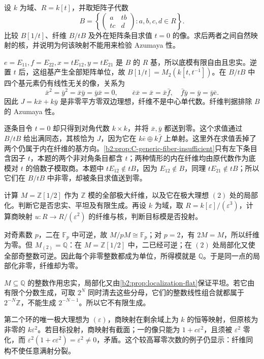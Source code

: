 \begin{exercise}\label{b2:ex:C-generic-fiber-insufficient}
	设 \(k\) 为域、\(R=k[t]\)，并取矩阵子代数
	\[
		B=\left\{\begin{pmatrix}a&tb\\tc&d\end{pmatrix}:a,b,c,d\in R\right\}.
	\]
	比较 \(B[1/t]\)、纤维 \(B/tB\) 及外在矩阵条目求值 \(t=0\) 的像。求后两者之间自然映射的核，并说明为何该映射不能用来检验 Azumaya 性。
\end{exercise}
\begin{solution}
	\(e=E_{11},f=E_{22},x=tE_{12},y=tE_{21}\) 是 \(B\) 的 \(R\) 基，所以底模有限自由且忠实。逆置 \(t\) 后，这组基产生全部矩阵单位，故 \(B[1/t]=M_2(k[t,t^{-1}])\)。在 \(B/tB\) 中四个基元素仍有线性无关的像，关系为
	\[
		\bar x^2=\bar y^2=\bar x\bar y=\bar y\bar x=0, \qquad \bar e\bar x=\bar x=\bar x\bar f, \quad \bar f\bar y=\bar y=\bar y\bar e.
	\]
	因此 \(J=k\bar x+k\bar y\) 是非零平方零双边理想，纤维不是中心单代数。纤维判据排除 \(B\) 的 Azumaya 性。

	逐条目令 \(t=0\) 却只得到对角代数 \(k\times k\)，并将 \(\bar x,\bar y\) 都送到零。这个求值通过 \(B/tB\) 给出满同态，其核恰为 \(J\)，因为它在 \(k\bar e\oplus k\bar f\) 上单射。这里外在求值丢掉了两个仍属于内在纤维的基方向。\cref{b2:prop:C-generic-fiber-insufficient}只有左下条目含因子 \(t\)，本题的两个非对角条目都含 \(t\)；两种情形的内在纤维均由原代数作为底模对 \(t\) 的倍数子模取商。本题中 \(tE_{12}\notin tB\)，因为 \(E_{12}\notin B\)，同理 \(tE_{21}\notin tB\)；所以它们在 \(B/tB\) 中非零，却被条目求值送到零。
\end{solution}

\begin{exercise}\label{b2:ex:C-finite-fiber-hypothesis}
	计算 \(M=\mathbb Z[1/2]\) 作为 \(\mathbb Z\) 模的全部极大纤维，以及它在极大理想 \((2)\) 处的局部化。判断它是否忠实、平坦及有限生成。再设 \(k\) 为域，取 \(R=k[\varepsilon]/(\varepsilon^3)\)，计算商映射 \(u:R\rightarrow R/(\varepsilon^2)\) 的纤维与核，判断目标模是否投射。
\end{exercise}
\begin{solution}
	对奇素数 \(p\)，二在 \(\mathbb F_p\) 中可逆，故 \(M/pM\cong\mathbb F_p\)；对 \(p=2\)，有 \(2M=M\)，所以纤维为零。但 \(M_{(2)}=\mathbb Q\)：在 \(M=\mathbb Z[1/2]\) 中，二已经可逆；在 \((2)\) 处局部化又使全部奇整数可逆。因此每个非零整数都成为单位，所得模就是 \(\mathbb Q\)。于是同一点的局部化非零，纤维却为零。

	\(M\subseteq\mathbb Q\) 的整数作用忠实，局部化又由\cref{b2:prop:localization-flat}保证平坦。若它由有限个分数生成，可取 \(2^N\) 同时清去这些分母，它们的整数线性组合就都属于 \(2^{-N}\mathbb Z\)，不能生成 \(2^{-N-1}\)。所以它不有限生成。

	第二个环的唯一极大理想为 \((\varepsilon)\)，商映射在剩余域上为 \(k\) 的恒等映射，但原核为非零的 \(k\varepsilon^2\)。若目标投射，商映射有截面；一的像只能为 \(1+c\varepsilon^2\)，且须被 \(\varepsilon^2\) 零化，而 \(\varepsilon^2(1+c\varepsilon^2)=\varepsilon^2\ne0\)，矛盾。这个较高幂零次数的例子仍显示：纤维同构不使任意满射分裂。
\end{solution}

